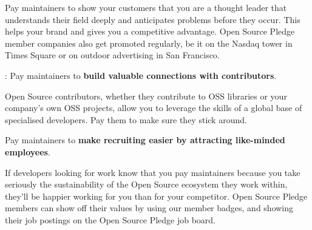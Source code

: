\begin{multicols}{2}
Pay maintainers to show your customers that you are a thought leader that understands their field deeply and anticipates
problems before they occur. This helps your brand and gives you a competitive advantage. Open Source Pledge member
companies also get promoted regularly, be it on the Nasdaq tower in Times Square or on outdoor advertising in San
Francisco.

\vspace{3mm}

: Pay maintainers to \textbf{build valuable connections with contributors}.

Open Source contributors, whether they contribute to OSS libraries or your company's own OSS projects, allow you to
leverage the skills of a global base of specialised developers. Pay them to make sure they stick around.

\vspace{3mm}

 Pay maintainers to \textbf{make recruiting easier by attracting like-minded employees}.

If developers looking for work know that you pay maintainers because you take seriously the sustainability of the Open
Source ecosystem they work within, they'll be happier working for you than for your competitor. Open Source Pledge
members can show off their values by using our member badges, and showing their job postings on the Open Source
Pledge job board.

\vspace{3mm}


\end{multicols}


